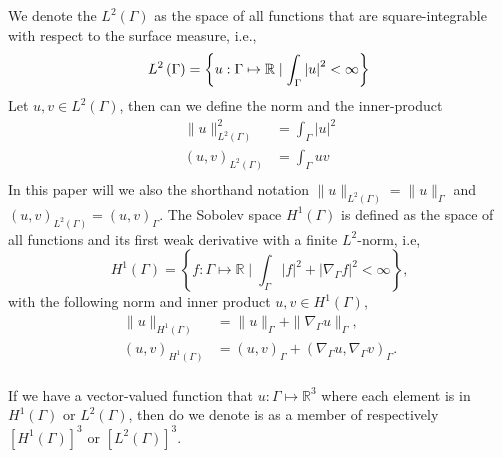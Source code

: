 We denote the $L^2\left( \Gamma  \right)  $ as the space of all functions that are square-integrable with respect to the surface measure, i.e., \[
   L^{2}\left( \Gamma   \right)  = \left\{ u: \Gamma \mapsto \mathbb{R}  \mid  \int_{\Gamma }^{}    \left\lvert u \right\rvert ^{2} < \infty   \right\} \\
\]
Let $u,v \in L^{2}\left( \Gamma  \right) $, then can we define the norm and the inner-product \[
    \begin{split}
        \| u \|_{ L^{2}\left( \Gamma  \right)  }^{ 2 } & = \int_{\Gamma }^{} \left\lvert u \right\rvert ^2 \\
        \left( u, v \right)_{L^2\left( \Gamma  \right) } &= \int_{\Gamma }^{} uv  \\
    \end{split}
\]
In this paper will we also the shorthand notation $\| u \|_{ L^2\left( \Gamma  \right)  }^{  }  = \| u \|_{ \Gamma  }^{  } $ and $\left( u,v \right)_{L^2\left( \Gamma  \right) } = \left( u,v \right) _{\Gamma } $.
The Sobolev space $H^1\left( \Gamma  \right) $ is defined as the space of all functions and its first weak derivative with a finite $L^{2}$-norm, i.e,
\[
H^{1}\left( \Gamma  \right) = \left\{ f: \Gamma \mapsto \mathbb{R}   \mid  \int_{\Gamma }^{}
\left\lvert f \right\rvert ^2  + \left\lvert \nabla_\Gamma  f \right\rvert ^2 < \infty \right\},
\]
with the following norm and inner product $u,v \in H^{1}\left( \Gamma  \right) $,
\[
    \begin{split}
        \| u \|_{ H ^{1}\left( \Gamma  \right)  }^{  }  & = \| u \|_{ \Gamma  }^{  }  + \| \nabla_ \Gamma u \|_{ \Gamma  }^{  },  \\
        \left( u, v \right)_{H^1\left( \Gamma  \right) } &= \left( u,v \right) _{\Gamma } + \left( \nabla_\Gamma u, \nabla _{\Gamma } v  \right) _{\Gamma }.   \\
    \end{split}
\]

If we have a vector-valued function that $u: \Gamma  \mapsto  \mathbb{R} ^{3} $ where each element is in $H^1\left( \Gamma  \right) $ or $L^2\left( \Gamma  \right) $, then do we denote is as a member of respectively $\left[ H^{1}\left( \Gamma
\right)   \right]^3 $ or $\left[ L^2\left( \Gamma  \right)  \right] ^3$.





